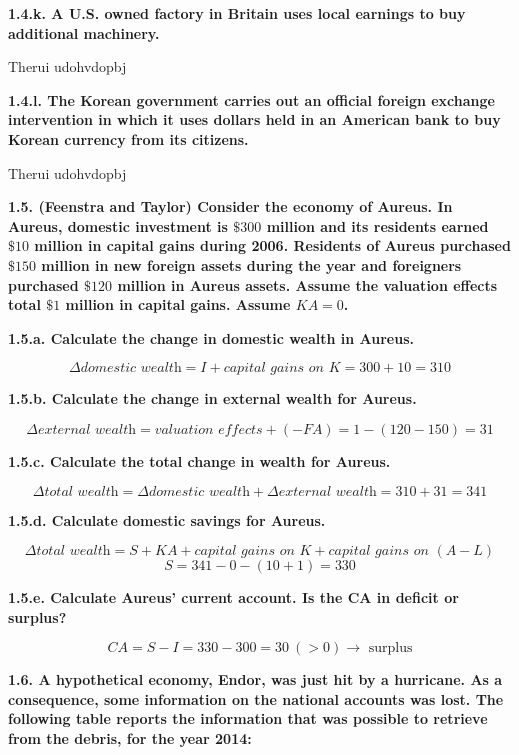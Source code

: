 \documentclass[11pt, a4paper]{article}
\begin{document}
\textbf{1.4.k. A U.S. owned factory in Britain uses local earnings to buy additional machinery.}

\vspace{0.075in}
Therui udohvdopbj
\vspace{0.075in}

\textbf{1.4.l. The Korean government carries out an official foreign exchange intervention in which
it uses dollars held in an American bank to buy Korean currency from its citizens.}

\vspace{0.075in}
Therui udohvdopbj
\vspace{0.3in}


\textbf{1.5. (Feenstra and Taylor) Consider the economy of Aureus. In Aureus, domestic investment is $\$300$ million and its residents earned $\$10$ million in capital gains during 2006. Residents of Aureus purchased $\$150$ million in new foreign assets during the year and foreigners purchased $\$120$ million in Aureus assets. Assume the valuation effects total $\$1$ million in capital gains. Assume $KA = 0$. }

\textbf{1.5.a. Calculate the change in domestic wealth in Aureus.}

$$\Delta \textit{domestic wealth} = I + \textit{capital gains on K} =  300 + 10 = 310$$

\textbf{1.5.b. Calculate the change in external wealth for Aureus.}

$$\Delta \textit{external wealth} =\textit{valuation effects} + (-FA) =  1 - (120-150) = 31$$

\textbf{1.5.c. Calculate the total change in wealth for Aureus.}

$$\Delta \textit{total wealth} =\Delta \textit{domestic wealth} + \Delta \textit{external wealth} =  310 + 31 = 341$$

\textbf{1.5.d. Calculate domestic savings for Aureus.}

$$\Delta \textit{total wealth} = S + KA + \textit{capital gains on K} + \textit{capital gains on $(A-L)$} $$
$$ S = 341 - 0 - (10 + 1) =  330$$

\textbf{1.5.e. Calculate Aureus’ current account. Is the CA in deficit or surplus?}

$$ CA = S - I = 330 - 300 = 30 \ (>0) \rightarrow \text{ surplus}$$
\vspace{0.1in}

\textbf{1.6. A hypothetical economy, Endor, was just hit by a hurricane. As a consequence, some information on the national accounts was lost. The following table reports the information that was possible to retrieve from the debris, for the year 2014: }
\end{document}
